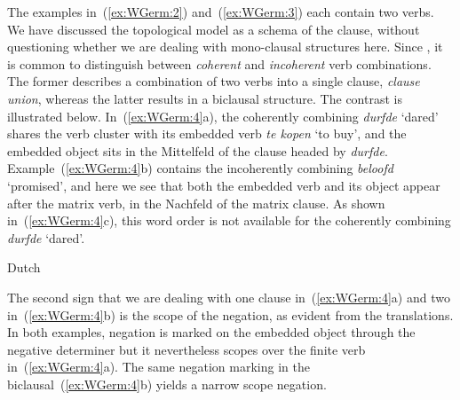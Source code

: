 \documentclass[output=paper,hidelinks]{langscibook}
\begin{document}
The examples in~(\ref{ex:WGerm:2}) and~(\ref{ex:WGerm:3}) each contain two verbs. We
have discussed the topological model as a schema of the clause,
without questioning whether we are dealing with mono-clausal
structures here. Since \citet{bech:1955}, it is common to distinguish
between \textit{coherent} and \textit{incoherent} verb
combinations. The former describes a combination of two verbs into a
single clause, \textit{clause union}, whereas the latter results in a
biclausal structure. The contrast is illustrated below. In~(\ref{ex:WGerm:4}a),
the coherently combining \textit{durfde} `dared' shares the verb
cluster with its embedded verb \textit{te kopen} `to buy', and the
embedded object sits in the Mittelfeld of the clause headed by
\textit{durfde}.  Example~(\ref{ex:WGerm:4}b) contains the incoherently
combining \textit{beloofd} `promised', and here we see that both the
embedded verb and its object appear after the matrix verb, in the
Nachfeld of the matrix clause. As shown in~(\ref{ex:WGerm:4}c), this word order
is not available for the coherently combining \textit{durfde} `dared'.
%
\begin{exe}
  \ex\label{ex:WGerm:4} Dutch
  \begin{xlist}
  \end{xlist}
\end{exe}
%
The second sign that we are dealing with one clause in~(\ref{ex:WGerm:4}a) and two
in~(\ref{ex:WGerm:4}b) is the scope of the negation, as evident from the
translations. In both examples, negation is marked on the embedded object through the
negative determiner but it nevertheless scopes over the finite verb
in~(\ref{ex:WGerm:4}a). The same negation marking in the biclausal~(\ref{ex:WGerm:4}b)
yields a narrow scope negation.
\end{document}
